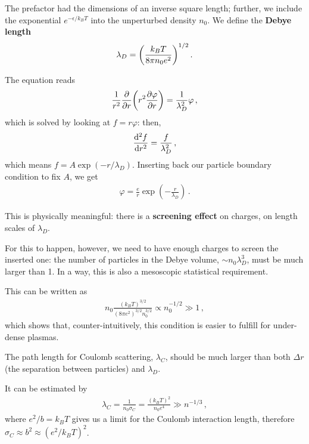 \documentclass[main.tex]{subfiles}
\begin{document}
The prefactor had the dimensions of an inverse square length; further, we include the exponential \(e^{- \epsilon / k_BT}\) into the unperturbed density \(n_0 \).
We define the \textbf{Debye length}
%
\begin{align}
\lambda _D = \qty(\frac{k_B T}{8 \pi n_0 e^2})^{1/2}
\,.
\end{align}

The equation reads 
%
\begin{align}
\frac{1}{r^2} \pdv{r} \qty(r^2 \pdv{\varphi }{r}) 
= \frac{1}{\lambda _D^2} \varphi 
\,,
\end{align}
%
which is solved by looking at \(f = r \varphi \): then, 
%
\begin{align}
\dv[2]{f}{r} = \frac{f}{\lambda _D^2}
\,,
\end{align}
%
which means \(f = A \exp(- r / \lambda _D)\). 
Inserting back our particle boundary condition to fix \(A\), we get 
%
\begin{align}
\varphi = \frac{e}{r} \exp(- \frac{r}{\lambda _D})
\,.
\end{align}

This is physically meaningful: there is a \textbf{screening effect} on charges, on length scales of \(\lambda _D\). 

For this to happen, however, we need to have enough charges to screen the inserted one: the number of particles in the Debye volume, \(\sim n_0 \lambda _D^3\), must be much larger than 1. 
In a way, this is also a mesoscopic statistical requirement. 

This can be written as 
%
\begin{align}
n_0 \frac{(k_BT)^{3/2}}{( 8 \pi e^2)^{3/2} n_0^{3/2}} \propto n_0^{-1/2} \gg 1
\,,
\end{align}
%
which shows that, counter-intuitively, this condition is easier to fulfill for under-dense plasmas. 

The path length for Coulomb scattering, \(\lambda _C\), should be much larger than both \(\Delta r\) (the separation between particles) and \(\lambda _D\). 

It can be estimated by 
%
\begin{align}
\lambda _C = \frac{1}{n_0 \sigma _C} = \frac{(k_B T)^2}{n_0 e^{4}} \gg n^{-1/3} 
\,,
\end{align}
%
where \(e^2 / b = k_B T\) gives us a limit for the Coulomb interaction length, therefore \(\sigma _C \approx b^2 \approx (e^2 / k_B T)^2\). 

\end{document}
